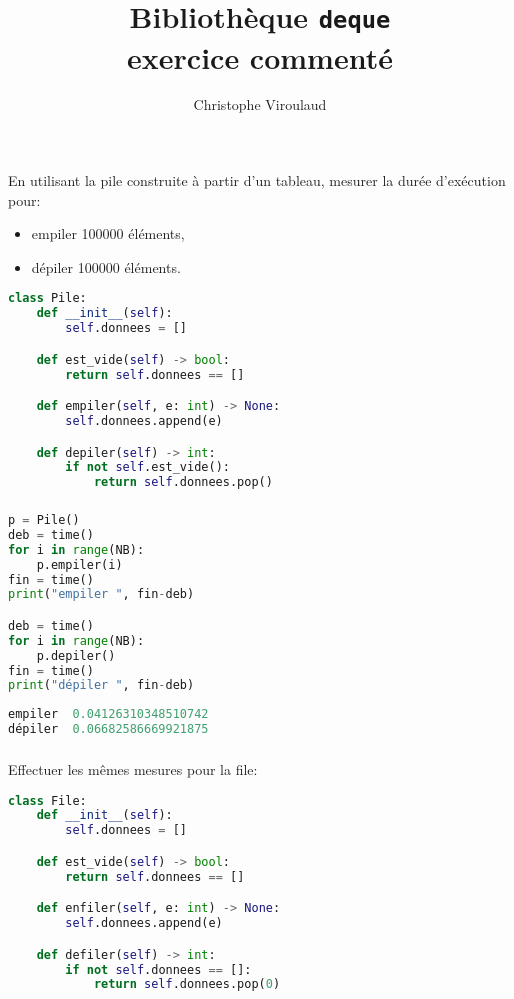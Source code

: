 \documentclass[svgnames,11pt]{beamer}
\author[]{Christophe Viroulaud}
\title{Bibliothèque \textbf{\texttt{deque}}\\exercice commenté}
\date{\framebox{\textbf{Archi 07}}}
\institute{Terminale - NSI}
\begin{document}
\begin{frame}
\titlepage
\end{frame}
\begin{frame}[fragile]
    \frametitle{}
En utilisant la pile construite à partir d'un tableau, mesurer la durée d'exécution pour:
\begin{itemize}
    \item empiler 100000 éléments,
    \item dépiler 100000 éléments.
\end{itemize}
    
\begin{lstlisting}[language=Python , basicstyle=\ttfamily\small, xleftmargin=2em, xrightmargin=2em]
class Pile:
    def __init__(self):
        self.donnees = []

    def est_vide(self) -> bool:
        return self.donnees == []

    def empiler(self, e: int) -> None:
        self.donnees.append(e)

    def depiler(self) -> int:
        if not self.est_vide():
            return self.donnees.pop()
\end{lstlisting}
\end{frame}
\begin{frame}[fragile]
    \frametitle{}

\begin{lstlisting}[language=Python , basicstyle=\ttfamily\small, xleftmargin=2em, xrightmargin=2em]
p = Pile()
deb = time()
for i in range(NB):
    p.empiler(i)
fin = time()
print("empiler ", fin-deb)

deb = time()
for i in range(NB):
    p.depiler()
fin = time()
print("dépiler ", fin-deb)
\end{lstlisting}
\begin{lstlisting}[language=Python , basicstyle=\ttfamily\small, xleftmargin=2em, xrightmargin=2em]
empiler  0.04126310348510742
dépiler  0.06682586669921875    
\end{lstlisting}
\end{frame}
\begin{frame}[fragile]
    \frametitle{}

Effectuer les mêmes mesures pour la file:
\begin{lstlisting}[language=Python , basicstyle=\ttfamily\small, xleftmargin=2em, xrightmargin=2em]
class File:
    def __init__(self):
        self.donnees = []

    def est_vide(self) -> bool:
        return self.donnees == []

    def enfiler(self, e: int) -> None:
        self.donnees.append(e)

    def defiler(self) -> int:
        if not self.donnees == []:
            return self.donnees.pop(0)
\end{lstlisting}
\end{frame}
\end{document}
